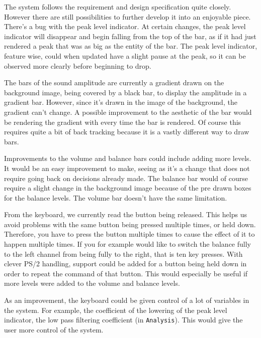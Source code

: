 The system follows the requirement and design specification quite closely. However there are still possibilities to further develop it into an enjoyable piece. There's a bug with the peak level indicator.  At certain changes, the peak level indicator will disappear and begin falling from the top of the bar, as if it had just rendered a peak that was as big as the entity of the bar. The peak level indicator, feature wise, could when updated have a slight pause at the peak, so it can be observed more clearly before beginning to drop.

The bars of the sound amplitude are currently a gradient drawn on the background image, being covered by a black bar, to display the amplitude in a gradient bar. However, since it's drawn in the image of the background, the gradient can't change. A possible improvement to the aesthetic of the bar would be rendering the gradient with every time the bar is rendered. Of course this requires quite a bit of back tracking because it is a vastly different way to draw bars. 

Improvements to the volume and balance bars could include adding more levels. It would be an easy improvement to make, seeing as it's a change that does not require going back on decisions already made. The balance bar would of course require a slight change in the background image because of the pre drawn boxes for the balance levels. The volume bar doesn't have the same limitation.

From the keyboard, we currently read the button being released. This helps us avoid problems with the same button being pressed multiple times, or held down. Therefore, you have to press the button multiple times to cause the effect of it to happen multiple times. If you for example would like to switch the balance fully to the left channel from being fully to the right, that is ten key presses. With clever PS/2 handling, support could be added for a button being held down in order to  repeat the command of that button. This would especially be useful if more levels were added to the volume and balance levels. 

As an improvement, the keyboard could be given control of a lot of variables in the system. For example, the coefficient of the lowering of the peak level indicator, the low pass filtering coefficient (in \texttt{Analysis}). This would give the user more control of the system.
